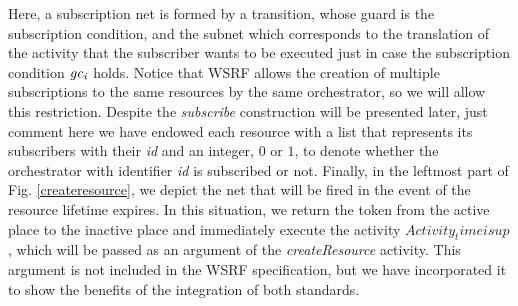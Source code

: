 Here, a subscription net is formed by a transition, whose guard is the subscription condition, and the subnet which corresponds to the translation of the activity that the subscriber wants to be executed just in case the subscription condition ${\it gc_i}$ holds. Notice that WSRF allows the creation of multiple subscriptions to the same resources by the same orchestrator, so we will allow this restriction. Despite the {\em subscribe} construction will be presented later, just comment here we have endowed each resource with a list that represents its subscribers with their {\em id} and an integer, $0$ or $1$, to denote whether the orchestrator with identifier {\em id} is subscribed or not. Finally, in the leftmost part of Fig. \ref{createresource}, we depict the net that will be fired in the event of the resource lifetime expires. In this situation, we return the token from the active place to the inactive place and immediately execute the activity {\em $Activity_timeisup$}, which will be passed as an argument of the {\em createResource} activity. This argument is not included in the WSRF specification, but we have incorporated it to show the benefits of the integration of both standards.       


